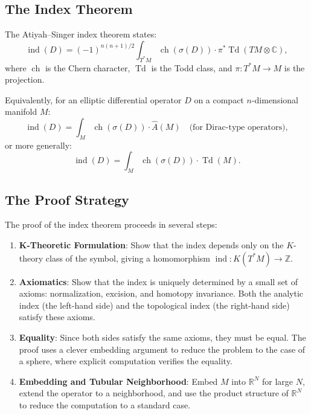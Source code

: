 \subsection{The Index Theorem}

The Atiyah--Singer index theorem states:
\[
\operatorname{ind}(D) = (-1)^{n(n+1)/2} \int_{T^*M} \operatorname{ch}(\sigma(D)) \cdot \pi^* \operatorname{Td}(TM \otimes \mathbb{C}),
\]
where $\operatorname{ch}$ is the Chern character, $\operatorname{Td}$ is the Todd class, and $\pi: T^*M \to M$ is the projection.

Equivalently, for an elliptic differential operator $D$ on a compact $n$-dimensional manifold $M$:
\[
\operatorname{ind}(D) = \int_M \operatorname{ch}(\sigma(D)) \cdot \widehat A(M) \quad \text{(for Dirac-type operators)},
\]
or more generally:
\[
\operatorname{ind}(D) = \int_M \operatorname{ch}(\sigma(D)) \cdot \operatorname{Td}(M).
\]

\subsection{The Proof Strategy}

The proof of the index theorem proceeds in several steps:

\begin{enumerate}
\item \textbf{K-Theoretic Formulation}: Show that the index depends only on the $K$-theory class of the symbol, giving a homomorphism $\operatorname{ind}: K(T^*M) \to \mathbb{Z}$.

\item \textbf{Axiomatics}: Show that the index is uniquely determined by a small set of axioms: normalization, excision, and homotopy invariance. Both the analytic index (the left-hand side) and the topological index (the right-hand side) satisfy these axioms.

\item \textbf{Equality}: Since both sides satisfy the same axioms, they must be equal. The proof uses a clever embedding argument to reduce the problem to the case of a sphere, where explicit computation verifies the equality.

\item \textbf{Embedding and Tubular Neighborhood}: Embed $M$ into $\mathbb{R}^N$ for large $N$, extend the operator to a neighborhood, and use the product structure of $\mathbb{R}^N$ to reduce the computation to a standard case.
\end{enumerate}

